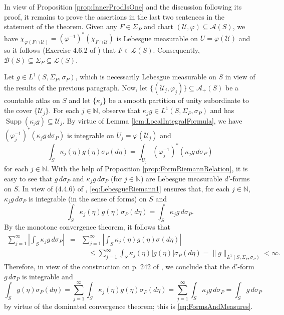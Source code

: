 \documentclass[smallextended]{svjour3}
\theoremstyle{remark}
\renewenvironment{proof}[1][\proofname]{\renewcommand\xproofname{#1}\xproof}{\endxproof}
\newcommand\supp{\operatorname{Supp}}
\begin{document}
\begin{proof}[Proof of Theorem \ref{thm:RiemannLebesgue}]
In view of Proposition \ref{prop:InnerProdIsOne} and the discussion following its proof, it remains to prove the assertions in the last two sentences in the statement of the theorem. Given any $F\in \Sigma_P$ and chart $(\mathcal{U},\varphi)\subseteq \mathcal{A}(S)$, we have $\chi_{\varphi(F\cap \mathcal{U})}=(\varphi^{-1})^*\left(\chi_{F\cap\mathcal{U}}\right)$ is Lebesgue measurable on $U=\varphi(\mathcal{U})$ and so it follows (Exercise 4.6.2 of \cite{naber_topology_2011}) that $F\in\mathcal{L}(S)$. Consequently, $\mathcal{B}(S)\subseteq\Sigma_P\subseteq\mathcal{L}(S)$.

Let $g\in L^1(S,\Sigma_P,\sigma_P)$, which is necessarily Lebesgue measurable on $S$ in view of the results of the previous paragraph. Now, let  $\{(\mathcal{U}_j,\varphi_j)\}\subseteq\mathcal{A}_+(S)$ be a countable atlas on $S$ and let $\{\kappa_j\}$ be a smooth partition of unity subordinate to the cover $\{\mathcal{U}_j\}$. For each $j\in\mathbb{N}$, observe that $\kappa_j g\in L^1(S,\Sigma_P,\sigma_P)$ and has $\supp(\kappa_j g)\subseteq \mathcal{U}_j$. By virtue of Lemma \ref{lem:LocalIntegralFormula}, we have $(\varphi_j^{-1})^*(\kappa_j g\,d\sigma_P)$ is integrable on $U_j=\varphi(\mathcal{U}_j)$ and
\begin{equation}\label{eq:LebesgueRiemann1}
\int_S \kappa_j(\eta)g(\eta)\sigma_P(d\eta)=\int_{U_j}(\varphi_j^{-1})^*(\kappa_j g\,d\sigma_P)
\end{equation}
for each $j\in\mathbb{N}$. With the help of Proposition \ref{prop:FormRiemannRelation}, it is easy to see that $g\,d\sigma_P$ and $\kappa_j g\,d\sigma_P$ (for $j\in\mathbb{N}$) are Lebesgue measurable $d'$-forms on $S$. In view of (4.4.6) of \cite{naber_topology_2011}, \eqref{eq:LebesgueRiemann1} ensures that, for each $j\in\mathbb{N}$, $\kappa_j g\,d\sigma_P$ is integrable (in the sense of forms) on $S$ and
\begin{equation*}
\int_S \kappa_j(\eta)g(\eta)\sigma_P(d\eta)=\int_S \kappa_j g\,d\sigma_P.
\end{equation*}
By the monotone convergence theorem, it follows that
\begin{eqnarray*}
\sum_{j=1}^\infty\left| \int_S \kappa_j g\,d\sigma_P\right|
&=&\sum_{j=1}^\infty \left|\int_S \kappa_j(\eta)g(\eta)\sigma(d\eta)\right|\\
&&\quad \leq \sum_{j=1}^\infty\int_S \kappa_j(\eta)|g(\eta)|\sigma_P(d\eta)=\|g\|_{L^1(S,\Sigma_P,\sigma_P)}<\infty.
\end{eqnarray*}
Therefore, in view of the construction on p. 242 of \cite{naber_topology_2011}, we conclude that the $d'$-form $g\,d\sigma_P$ is integrable and
\begin{equation*}
\int_S g(\eta)\sigma_P(d\eta)=\sum_{j=1}^\infty \int_S \kappa_j(\eta)g(\eta)\sigma_P(d\eta)=\sum_{j=1}^\infty \int_{S} \kappa_j g\,d\sigma_P=\int_S g\,d\sigma_P
\end{equation*}
by virtue of the dominated convergence theorem; this is \eqref{eq:FormsAndMeasures}.


\end{proof}
\end{document}
